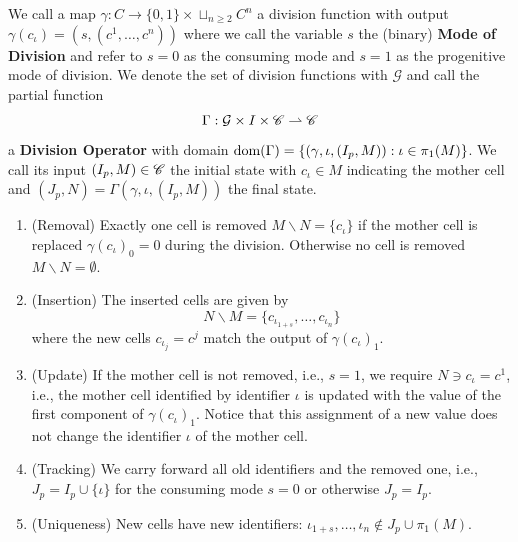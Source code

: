 \begin{definition}
    We call a map $\gamma:C\rightarrow \{0,1\}\times\sqcup_{n\geq 2}C^n$ a division function
    with output $\gamma(c_\iota) = (s,(c^1,\dots,c^n))$ where we call the variable $s$ the (binary)
    \textbf{Mode of Division} and refer to $s=0$ as the consuming mode and $s=1$ as the progenitive
    mode of division.
    We denote the set of division functions with $\mathcal{G}$ and call the partial function
    \begin{equation}
        \Gamma:\mathcal{G}\times I\times\mathscr{C}\rightharpoonup\mathscr{C}
    \end{equation}
    a \textbf{Division Operator} with domain
    $\text{\normalfont dom}(\Gamma)=\{(\gamma,\iota,(I_p,M)):\iota\in\pi_1(M)\}$.
    We call its input $(I_p,M)\in\mathscr{C}$ the initial state with $c_\iota\in M$ indicating the mother
    cell and $(J_p,N)=\Gamma(\gamma,\iota,(I_p,M))$ the final state.
    \begin{enumerate}
        \item (Removal) Exactly one cell is removed $M\backslash N=\{c_\iota\}$ if
            the mother cell is replaced $\gamma(c_\iota)_0=0$ during the division.
            Otherwise no cell is removed $M\backslash N=\emptyset$.
        \item (Insertion) The inserted cells are given by
            \begin{equation}
                N\backslash M = \{c_{\iota_{1+s}},\dots,c_{\iota_n}\}
            \end{equation}
            where the new cells $c_{\iota_j}=c^j$ match the output of $\gamma(c_\iota)_1$.
        \item (Update)
            If the mother cell is not removed, i.e., $s=1$, we require
            $N\ni c_\iota=c^1$, i.e., the mother cell identified by identifier $\iota$ is updated
            with the value of the first component of $\gamma(c_\iota)_1$.
            Notice that this assignment of a new value does not change the identifier $\iota$ of the
            mother cell.
        \item (Tracking) We carry forward all old identifiers and the removed one, i.e.,
            $J_p=I_p\cup\{\iota\}$ for the consuming mode $s=0$ or otherwise $J_p=I_p$.
        \item (Uniqueness) New cells have new identifiers:
            $\iota_{1+s},\dots,\iota_n\notin J_p\cup\pi_1(M)$.
    \end{enumerate}
    \label{definition:cell-division-single}
\end{definition}

